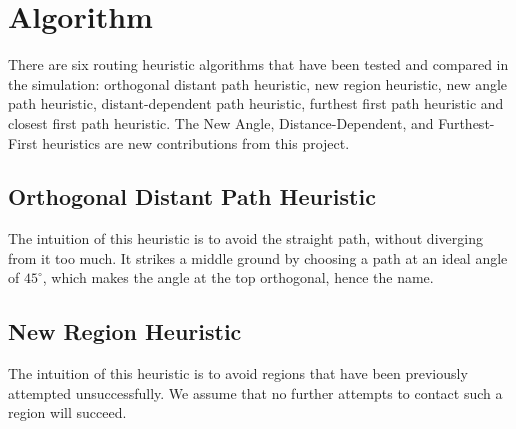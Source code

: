 \documentclass[conference]{IEEEtran}
\begin{document}

\section{Algorithm}
There are six routing heuristic algorithms that have been tested and compared in the simulation: orthogonal distant path heuristic, new region heuristic, new angle path heuristic, distant-dependent path heuristic, furthest first path heuristic and closest first path heuristic.
The New Angle, Distance-Dependent, and Furthest-First heuristics are new contributions from this project.
\subsection{Orthogonal Distant Path Heuristic}
The intuition of this heuristic is to avoid the straight path, without diverging from it too much.  It strikes a middle ground by choosing a path at an ideal angle of $45^{\circ}$, which makes the angle at the top orthogonal, hence the name.
\begin{algorithm}
\DontPrintSemicolon
{}
\SetAlgoLined
\SetAlgoLongEnd
\scriptsize
{}
\caption{}
\small
\end{algorithm}

%
\subsection{New Region Heuristic}
The intuition of this heuristic is to avoid regions that have been previously attempted unsuccessfully.  We assume that no further attempts to contact such a region will succeed.
\begin{algorithm}
\DontPrintSemicolon
{}
\SetAlgoLined
\SetAlgoLongEnd
\scriptsize
{}
\caption{}
\small
\end{algorithm}
\end{document}
